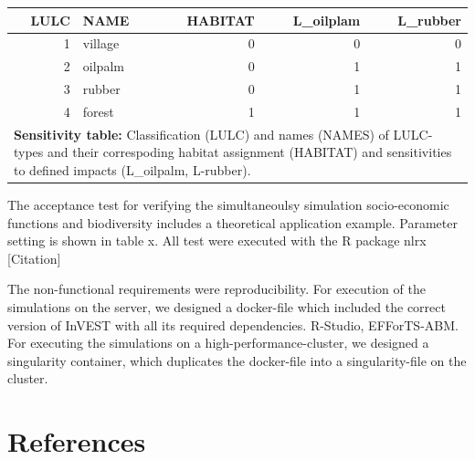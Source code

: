 \documentclass[
]{article}
\begin{document}
\begin{table}
\centering
\begin{tabular}[t]{r|l|r|r|r}
\hline
LULC & NAME & HABITAT & L\_oilplam & L\_rubber\\
\hline
1 & village & 0 & 0 & 0\\
\hline
2 & oilpalm & 0 & 1 & 1\\
\hline
3 & rubber & 0 & 1 & 1\\
\hline
4 & forest & 1 & 1 & 1\\
\hline
\multicolumn{5}{l}{\rule{0pt}{1em}\textbf{Sensitivity table: } Classification (LULC) and names (NAMES) of LULC-types and their correspoding habitat assignment (HABITAT) and sensitivities to defined impacts (L\_oilpalm, L-rubber). }\\
\end{tabular}
\end{table}

The acceptance test for verifying the simultaneoulsy simulation
socio-economic functions and biodiversity includes a theoretical
application example. Parameter setting is shown in table x. All test
were executed with the R package nlrx {[}Citation{]}

The non-functional requirements were reproducibility. For execution of
the simulations on the server, we designed a docker-file which included
the correct version of InVEST with all its required dependencies.
R-Studio, EFForTS-ABM. For executing the simulations on a
high-performance-cluster, we designed a singularity container, which
duplicates the docker-file into a singularity-file on the cluster.

\hypertarget{references}{%
\section*{References}\label{references}}
\end{document}
